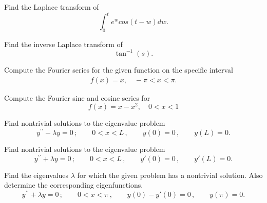 \documentclass[11pt]{article}
\begin{document}
\begin{problem}
Find the Laplace transform of 
\[\int_{0}^{t}e^{w}cos(t-w)dw.\]
\end{problem}


\begin{problem}
Find the inverse Laplace transform of 
\[\tan^{-1} (s).\]
\end{problem}




\begin{problem}
Compute the Fourier series for the given function on the specific interval
\begin{eqnarray*}
f(x) = x , \quad -\pi<x<\pi.
\end{eqnarray*}
\end{problem}


\begin{problem}
Compute the Fourier sine and cosine series for
\begin{equation*}
f(x) = x-x^2, \quad 0<x<1
\end{equation*}
\end{problem}



\begin{problem}
Find nontrivial solutions to the eigenvalue problem
\begin{equation*}
y^{\prime \prime} - \lambda y =0\,; \qquad  0<x<L \,, \qquad y(0)=0  \,,\qquad y(L) =0. 
\end{equation*}
\end{problem}


\begin{problem}
Find nontrivial solutions to the eigenvalue problem
\begin{equation*}
y^{\prime \prime} + \lambda y =0\,; \qquad  0<x<L \,, \qquad y'(0)=0  \,,\qquad y'(L) =0. 
\end{equation*}
\end{problem}

\begin{problem}
 Find the eigenvalues $\lambda$ for which the given problem has a nontrivial solution. Also determine the corresponding eigenfunctions.
\begin{equation*}
y^{\prime \prime} + \lambda y =0\,; \qquad  0<x<\pi \,, \qquad y(0) - y'(0)=0  \,,\qquad y(\pi) =0. 
\end{equation*}
\end{problem}
\end{document}
